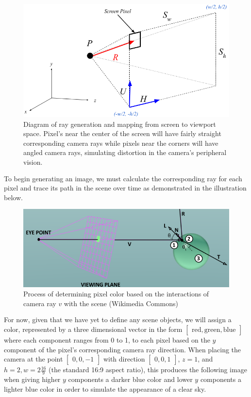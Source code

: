 \begin{figure}[H]
    \centering
    \includegraphics[scale=0.5]{figures/CameraRays.png}
    \caption{Diagram of ray generation and mapping from screen to viewport space. Pixel's near the center of the screen will have fairly straight corresponding camera rays while pixels near the corners will have angled camera rays, simulating distortion in the camera's peripheral vision.}
    \label{fig:cam_rays}
\end{figure}
\noindent
To begin generating an image, we must calculate the corresponding ray for each pixel and trace its path in the scene over time as demonstrated in the illustration below.

\begin{figure}[H]
    \centering
    \includegraphics[scale=0.5]{figures/ApproachIllustration.png}
    \caption{Process of determining pixel color based on the interactions of camera ray $v$ with the scene (Wikimedia Commons)}
    \label{fig:approach}
\end{figure}
\noindent
For now, given that we have yet to define any scene objects, we will assign a color, represented by a three dimensional vector in the form $\begin{bmatrix}\text{red}, \text{green}, \text{blue} \end{bmatrix}$ where each component ranges from 0 to 1, to each pixel based on the $y$ component of the pixel's corresponding camera ray direction. When placing the camera at the point $\begin{bmatrix}0, 0, -1 \end{bmatrix}$ with direction $\begin{bmatrix}0,  0, 1 \end{bmatrix}$, $z = 1$, and $h = 2, w = 2\frac{16}{9}$ (the standard 16:9 aspect ratio), this produces the following image when giving higher $y$ components a darker blue color and lower $y$ components a lighter blue color in order to simulate the appearance of a clear sky.

